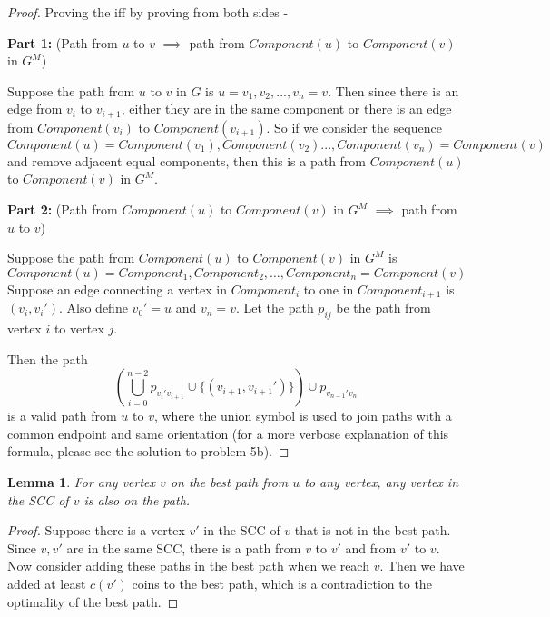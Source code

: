 \documentclass[answers]{exam}
\newtheorem{lemma}{Lemma}
\begin{document}
\begin{questions}
\begin{parts}
\begin{solution}
\begin{proof}
Proving the iff by proving from both sides -

\textbf{Part 1:} (Path from $u$ to $v$ $\implies$ path from $Component(u)$ to $Component(v)$ in $G^M$)

Suppose the path from $u$ to $v$ in $G$ is $u = v_1, v_2, ..., v_n = v$. Then since there is an edge from $v_i$ to $v_{i + 1}$, either they are in the same component or there is an edge from $Component(v_i)$ to $Component(v_{i + 1})$. So if we consider the sequence $$Component(u) = Component(v_1), Component(v_2) ..., Component(v_n) = Component(v)$$ and remove adjacent equal components, then this is a path from $Component(u)$ to $Component(v)$ in $G^M$.

\textbf{Part 2:} (Path from $Component(u)$ to $Component(v)$ in $G^M$ $\implies$ path from $u$ to $v$)

Suppose the path from $Component(u)$ to $Component(v)$ in $G^M$ is $$Component(u) = Component_1, Component_2, \dots, Component_n = Component(v)$$ Suppose an edge connecting a vertex in $Component_i$ to one in $Component_{i + 1}$ is $(v_i, v_i')$. Also define $v_0' = u$ and $v_n = v$. 
Let the path $p_{ij}$ be the path from vertex $i$ to vertex $j$.

Then the path $$\left(\bigcup_{i = 0}^{n - 2} p_{v_i'v_{i + 1}}\cup \{(v_{i + 1}, v_{i + 1}')\}\right) \cup p_{v_{n - 1}'v_{n}}$$ is a valid path from $u$ to $v$, where the union symbol is used to join paths with a common endpoint and same orientation (for a more verbose explanation of this formula, please see the solution to problem 5b).
\end{proof}



\begin{lemma}
For any vertex $v$ on the best path from $u$ to any vertex, any vertex in the SCC of $v$ is also on the path.
\end{lemma}

\begin{proof}
Suppose there is a vertex $v'$ in the SCC of $v$ that is not in the best path. Since $v, v'$ are in the same SCC, there is a path from $v$ to $v'$ and from $v'$ to $v$. Now consider adding these paths in the best path when we reach $v$. Then we have added at least $c(v')$ coins to the best path, which is a contradiction to the optimality of the best path.
\end{proof}


\end{solution}
\end{parts}
\end{questions}
\end{document}
